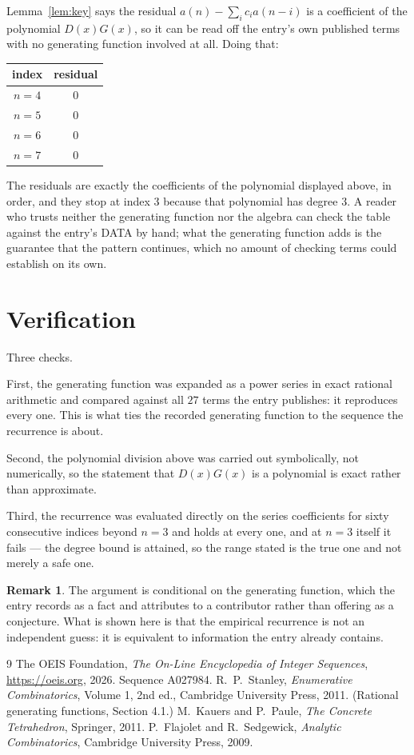 \documentclass[11pt,a4paper]{article}
\theoremstyle{plain}
\theoremstyle{definition}
\newtheorem{remark}[theorem]{Remark}
\begin{document}
Lemma~\ref{lem:key} says the residual $a(n)-\sum_ic_ia(n-i)$ is a coefficient of the
polynomial $D(x)G(x)$, so it can be read off the entry's own published terms with no
generating function involved at all. Doing that:
\begin{center}
\begin{tabular}{cc}
index & residual \\ \hline
$n=4$ & $0$ \\
$n=5$ & $0$ \\
$n=6$ & $0$ \\
$n=7$ & $0$
\end{tabular}
\end{center}
The residuals are exactly the coefficients of the polynomial displayed above, in order, and
they stop at index $3$ because that polynomial has degree $3$. A reader who trusts
neither the generating function nor the algebra can check the table against the entry's DATA
by hand; what the generating function adds is the guarantee that the pattern continues, which
no amount of checking terms could establish on its own.

\section{Verification}

Three checks.

First, the generating function was expanded as a power series in exact rational arithmetic and
compared against all $27$ terms the entry publishes: it reproduces every one. This is
what ties the recorded generating function to the sequence the recurrence is about.

Second, the polynomial division above was carried out symbolically, not numerically, so the
statement that $D(x)G(x)$ is a polynomial is exact rather than approximate.

Third, the recurrence was evaluated directly on the series coefficients for sixty consecutive
indices beyond $n=3$ and holds at every one, and at $n=3$ itself it fails --- the
degree bound is attained, so the range stated is the true one and not merely a safe one.

\begin{remark}
The argument is conditional on the generating function, which the entry records as a fact and
attributes to a contributor rather than offering as a conjecture. What is shown here is that
the empirical recurrence is not an independent guess: it is equivalent to information the
entry already contains.
\end{remark}

\begin{thebibliography}{9}
 The OEIS Foundation, \emph{The On-Line Encyclopedia of Integer
Sequences}, \url{https://oeis.org}, 2026. Sequence A027984.
 R.~P.~Stanley, \emph{Enumerative Combinatorics}, Volume 1, 2nd ed.,
Cambridge University Press, 2011. (Rational generating functions, Section 4.1.)
 M.~Kauers and P.~Paule, \emph{The Concrete Tetrahedron}, Springer, 2011.
 P.~Flajolet and R.~Sedgewick, \emph{Analytic Combinatorics}, Cambridge
University Press, 2009.
\end{thebibliography}
\end{document}
